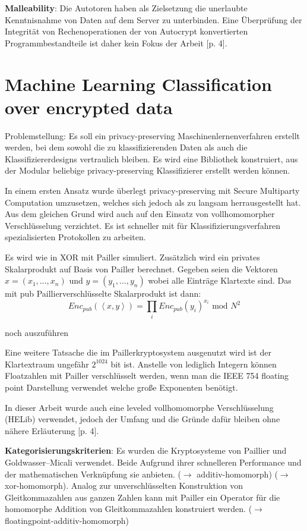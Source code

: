 \textbf{Malleability}: Die Autotoren haben als Zielsetzung die unerlaubte Kenntnisnahme von Daten auf dem Server zu unterbinden. Eine Überprüfung der Integrität von Rechenoperationen der von Autocrypt konvertierten Programmbestandteile ist daher kein Fokus der Arbeit [p. 4].

\section{Machine Learning Classification over encrypted data}
\label{ML}
 \cite{bost2015machine}
Problemstellung: Es soll ein privacy-preserving Maschinenlernenverfahren erstellt werden, bei dem sowohl die zu klassifizierenden Daten als auch die Klassifiziererdesigns vertraulich bleiben. Es wird eine Bibliothek konstruiert, aus der Modular beliebige privacy-preserving Klassifizierer erstellt werden können.

In einem ersten Ansatz wurde überlegt privacy-preserving mit Secure Multiparty Computation umzusetzen, welches sich jedoch als zu langsam herrausgestellt hat. Aus dem gleichen Grund wird auch auf den Einsatz von vollhomomorpher Verschlüsselung verzichtet. Es ist schneller mit für Klassifizierungsverfahren spezialisierten Protokollen zu arbeiten. 

Es wird wie in \cite{tople2013autocrypt} XOR mit Pailler simuliert. Zusätzlich wird ein privates Skalarprodukt auf Basis von Pailler berechnet.
Gegeben seien die Vektoren $x=(x_1,\ldots,x_n)$ und $y=(y_1,\ldots,y_n)$  wobei alle Einträge Klartexte sind. Das mit pub Paillierverschlüsselte Skalarprodukt ist dann:
\begin{equation}
Enc_{pub}(\left\langle x,y\right\rangle )=\prod_i Enc_{pub}(y_i)^{x_i} \text{ mod } N^2
\end{equation}

noch auszuführen

Eine weitere Tatsache die im Paillerkryptosystem ausgenutzt wird ist der Klartextraum ungefähr $2^{1024}$ bit ist. Anstelle von lediglich Integern können Floatzahlen mit Pailler verschlüsselt werden, wenn man die IEEE 754 floating point Darstellung verwendet welche große Exponenten benötigt.

In dieser Arbeit wurde auch eine leveled vollhomomorphe Verschlüsselung (HELib) verwendet, jedoch der Umfang und die Gründe dafür bleiben ohne nähere Erläuterung [p. 4].

\textbf{Kategorisierungskriterien}: Es wurden die Kryptosysteme von Paillier und Goldwasser–Micali verwendet. Beide Aufgrund ihrer schnelleren Performance und der mathematischen Verknüpfung sie anbieten. ($\rightarrow$ additiv-homomorph) ($\rightarrow$ xor-homomorph). Analog zur unverschlüsselten Konstruktion von Gleitkommazahlen aus ganzen Zahlen kann mit  Pailler ein Operator für die homomorphe Addition von Gleitkommazahlen konstruiert werden. ($\rightarrow$ floatingpoint-additiv-homomorph)

